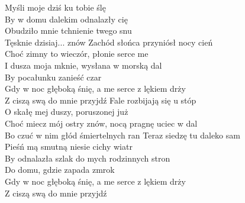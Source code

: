 
Myśli moje dziś ku tobie ślę\\
By w domu dalekim odnalazły cię\\
Obudziło mnie tchnienie twego snu\\
Tęsknie dzisiaj... znów
\hops
Zachód słońca przyniósł nocy cień\\
Choć zimny to wieczór, płonie serce me\\
I dusza moja mknie, wysłana w morską dal\\
By pocałunku zanieść czar
\hops
{} {}\\
 Gdy w noc głęboką śnię, a me serce z lękiem drży\\
 Z ciszą swą do mnie przyjdź
\hops
Fale rozbijają się u stóp\\
O skałę mej duszy, poruszonej już\\
Choć miecz mój ostry znów, nocą pragnę uciec w dal\\
Bo czuć w nim głód śmiertelnych ran
\hops
Teraz siedzę tu daleko sam\\
Pieśń mą smutną niesie cichy wiatr\\
By odnalazła szlak do mych rodzinnych stron\\
Do domu, gdzie zapada zmrok
\hops
{} {}\\
 Gdy w noc głęboką śnię, a me serce z lękiem drży\\
 Z ciszą swą do mnie przyjdź